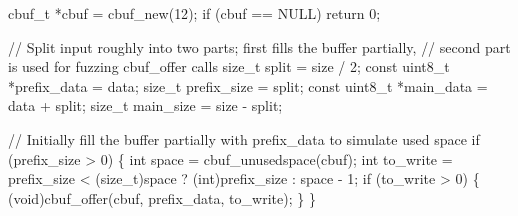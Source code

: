 \documentclass[
  a4paper,
]{scrreprt}
\newenvironment{Shaded}{\begin{snugshade}}{\end{snugshade}}
\newcommand{\CommentTok}[1]{\textcolor[rgb]{0.41,0.41,0.41}{#1}}
\newcommand{\ControlFlowTok}[1]{\textcolor[rgb]{0.85,0.12,0.09}{#1}}
\newcommand{\DataTypeTok}[1]{\textcolor[rgb]{0.47,0.16,0.63}{#1}}
\newcommand{\DecValTok}[1]{\textcolor[rgb]{0.47,0.16,0.63}{#1}}
\newcommand{\NormalTok}[1]{\textcolor[rgb]{0.33,0.33,0.33}{#1}}
\newcommand{\OperatorTok}[1]{\textcolor[rgb]{0.00,0.46,0.62}{#1}}
\theoremstyle{definition}
\theoremstyle{remark}
\begin{document}
\begin{Shaded}
\begin{Highlighting}[numbers=left,,]
\NormalTok{    cbuf\_t }\OperatorTok{*}\NormalTok{cbuf }\OperatorTok{=}\NormalTok{ cbuf\_new}\OperatorTok{(}\DecValTok{12}\OperatorTok{);}
    \ControlFlowTok{if} \OperatorTok{(}\NormalTok{cbuf }\OperatorTok{==}\NormalTok{ NULL}\OperatorTok{)}
        \ControlFlowTok{return} \DecValTok{0}\OperatorTok{;}

    \CommentTok{// Split input roughly into two parts; first fills the buffer partially,}
    \CommentTok{// second part is used for fuzzing cbuf\_offer calls}
    \DataTypeTok{size\_t}\NormalTok{ split }\OperatorTok{=}\NormalTok{ size }\OperatorTok{/} \DecValTok{2}\OperatorTok{;}
    \DataTypeTok{const} \DataTypeTok{uint8\_t} \OperatorTok{*}\NormalTok{prefix\_data }\OperatorTok{=}\NormalTok{ data}\OperatorTok{;}
    \DataTypeTok{size\_t}\NormalTok{ prefix\_size }\OperatorTok{=}\NormalTok{ split}\OperatorTok{;}
    \DataTypeTok{const} \DataTypeTok{uint8\_t} \OperatorTok{*}\NormalTok{main\_data }\OperatorTok{=}\NormalTok{ data }\OperatorTok{+}\NormalTok{ split}\OperatorTok{;}
    \DataTypeTok{size\_t}\NormalTok{ main\_size }\OperatorTok{=}\NormalTok{ size }\OperatorTok{{-}}\NormalTok{ split}\OperatorTok{;}

    \CommentTok{// Initially fill the buffer partially with prefix\_data to simulate used space}
    \ControlFlowTok{if} \OperatorTok{(}\NormalTok{prefix\_size }\OperatorTok{\textgreater{}} \DecValTok{0}\OperatorTok{)} \OperatorTok{\{}
        \DataTypeTok{int}\NormalTok{ space }\OperatorTok{=}\NormalTok{ cbuf\_unusedspace}\OperatorTok{(}\NormalTok{cbuf}\OperatorTok{);}
        \DataTypeTok{int}\NormalTok{ to\_write }\OperatorTok{=}\NormalTok{ prefix\_size }\OperatorTok{\textless{}} \OperatorTok{(}\DataTypeTok{size\_t}\OperatorTok{)}\NormalTok{space }\OperatorTok{?} \OperatorTok{(}\DataTypeTok{int}\OperatorTok{)}\NormalTok{prefix\_size }\OperatorTok{:}\NormalTok{ space }\OperatorTok{{-}} \DecValTok{1}\OperatorTok{;}
        \ControlFlowTok{if} \OperatorTok{(}\NormalTok{to\_write }\OperatorTok{\textgreater{}} \DecValTok{0}\OperatorTok{)} \OperatorTok{\{}
            \OperatorTok{(}\DataTypeTok{void}\OperatorTok{)}\NormalTok{cbuf\_offer}\OperatorTok{(}\NormalTok{cbuf}\OperatorTok{,}\NormalTok{ prefix\_data}\OperatorTok{,}\NormalTok{ to\_write}\OperatorTok{);}
        \OperatorTok{\}}
    \OperatorTok{\}}


\end{Highlighting}
\end{Shaded}
\end{document}
